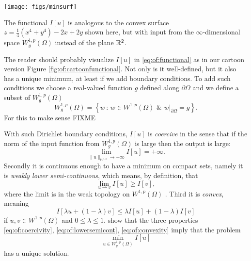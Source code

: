 \begin{marginfigure}
\texttt{[image: figs/minsurf]} %
\medskip
\caption{The functional $I[u]$ is analogous to the convex surface $z = \tfrac{1}{4}(x^4 + y^4) - 2x + 2y$ shown here, but with input from the $\infty$-dimensional space $W_g^{1,p}(\Omega)$ instead of the plane $\mathbb{R}^2$.}
\label{fig:of:cartoonfunctional}
\end{marginfigure}

The reader should probably visualize $I[u]$ in \eqref{eq:of:functional} as in our cartoon version Figure \ref{fig:of:cartoonfunctional}.  Not only is it well-defined, but it also has a unique minimum, at least if we add boundary conditions.  To add such conditions we choose a real-valued function $g$ defined along $\partial \Omega$ and we define a subset of $W_g^{1,p}(\Omega)$
\begin{equation}
    W_g^{1,p}(\Omega) = \left\{w \,:\, w \in W^{1,p}(\Omega) \,\, \& \,\, w\big|_{\partial \Omega} = g\right\}.  \label{eq:of:affinedirichlet}
\end{equation}
For this to make sense FIXME

With such Dirichlet boundary conditions, $I[u]$ is \emph{coercive} in the sense that if the norm of the input function from $W_g^{1,p}(\Omega)$ is large then the output is large:
\begin{equation}
\lim_{\|u\|_{W^{1,p}} \to +\infty} I[u] = +\infty.   \label{eq:of:coercivity}
\end{equation}
Secondly it is continuous enough to have a minimum on compact sets, namely it is \emph{weakly lower semi-continuous}, which means, by definition, that
\begin{equation}
\lim_{u\rightharpoonup v} I[u] \ge I[v],  \label{eq:of:lowersemicont}
\end{equation}
where the limit is in the weak topology on $W^{1,p}(\Omega)$ \citep{Evans2010,KinderlehrerStampacchia1980}.  Third it is \emph{convex}, meaning
\begin{equation}
I[\lambda u + (1-\lambda) v] \le \lambda I[u] + (1-\lambda) I[v]    \label{eq:of:convexity}
\end{equation}
if $u,v\in W^{1,p}(\Omega)$ and $0 \le \lambda \le 1$.  \citet{KinderlehrerStampacchia1980} show that the three properties \eqref{eq:of:coercivity}, \eqref{eq:of:lowersemicont}, \eqref{eq:of:convexity} imply that the problem
\begin{equation}
\min_{u \in W_g^{1,p}(\Omega)} I[u] \label{eq:of:plapmin}
\end{equation}
has a unique solution.


